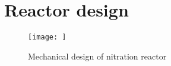 \section*{Reactor design}
\begin{figure}[h]
    \centering
    \texttt{[image: ]}
    \caption{Mechanical design of nitration reactor}
    \label{fig:comsol-S4-CW-X-T}
\end{figure}